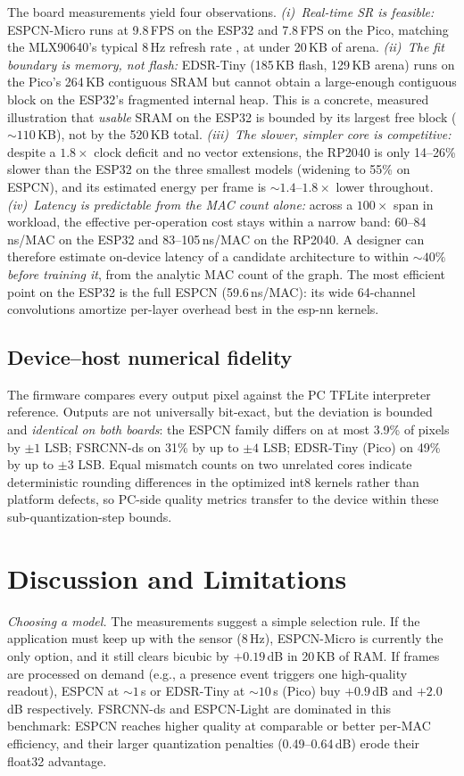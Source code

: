 \documentclass[conference,a4paper]{IEEEtran}
\begin{document}
The board measurements yield four observations. \emph{(i)~Real-time SR is feasible:}
ESPCN-Micro runs at 9.8\,FPS on the ESP32 and 7.8\,FPS on the Pico,
matching the MLX90640's typical 8\,Hz refresh rate \cite{mlx90640ds}, at
under 20\,KB of arena. \emph{(ii)~The fit boundary is memory, not flash:}
EDSR-Tiny (185\,KB flash, 129\,KB arena) runs on the Pico's 264\,KB
contiguous SRAM but cannot obtain a large-enough contiguous block on the
ESP32's fragmented internal heap. This is a concrete, measured illustration
that \emph{usable} SRAM on the ESP32 is bounded by its largest free block
(${\sim}110$\,KB), not by the 520\,KB total. \emph{(iii)~The slower, simpler
core is competitive:} despite a $1.8\times$ clock deficit and no vector
extensions, the RP2040 is only 14--26\% slower than the ESP32 on the three
smallest models (widening to 55\% on ESPCN), and its estimated energy per
frame is ${\sim}1.4$--$1.8\times$ lower throughout.
\emph{(iv)~Latency is predictable from the MAC count alone:} across a
$100\times$ span in workload, the effective per-operation cost stays within
a narrow band: 60--84\,ns/MAC on the ESP32 and 83--105\,ns/MAC on the
RP2040. A designer can therefore estimate on-device latency of a candidate
architecture to within ${\sim}40\%$ \emph{before training it}, from the
analytic MAC count of the graph. The most efficient point on the ESP32 is
the full ESPCN (59.6\,ns/MAC): its wide 64-channel convolutions amortize
per-layer overhead best in the esp-nn kernels.

\subsection{Device--host numerical fidelity}
\label{sec:fidelity}
The firmware compares every output pixel against the PC TFLite interpreter
reference. Outputs are not universally bit-exact, but the deviation is
bounded and \emph{identical on both boards}: the ESPCN family differs on at
most 3.9\% of pixels by $\pm 1$ LSB; FSRCNN-ds on 31\% by up to $\pm 4$ LSB;
EDSR-Tiny (Pico) on 49\% by up to $\pm 3$ LSB. Equal mismatch counts on two
unrelated cores indicate deterministic rounding differences in the optimized
int8 kernels rather than platform defects, so PC-side quality metrics
transfer to the device within these sub-quantization-step bounds.

\section{Discussion and Limitations}
\emph{Choosing a model.} The measurements suggest a simple selection rule.
If the application must keep up with the sensor (8\,Hz), ESPCN-Micro is
currently the only option, and it still clears bicubic by $+0.19$\,dB in
20\,KB of RAM. If frames are processed on demand (e.g., a presence event
triggers one high-quality readout), ESPCN at ${\sim}1$\,s or EDSR-Tiny at
${\sim}10$\,s (Pico) buy $+0.9$\,dB and $+2.0$\,dB respectively. FSRCNN-ds
and ESPCN-Light are dominated in this benchmark: ESPCN reaches higher
quality at comparable or better per-MAC efficiency, and their larger
quantization penalties (0.49--0.64\,dB) erode their float32 advantage.
\end{document}
